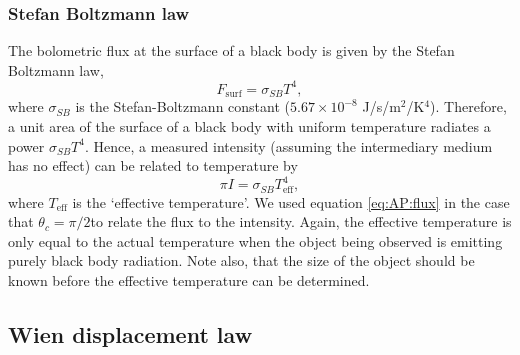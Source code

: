 \subsubsection{Stefan Boltzmann law}
The bolometric flux at the surface of a black body is given by the Stefan Boltzmann law,
%
\begin{equation}
	F_\text{surf} = \sigma_{SB} T^4,
	\label{eq:AP:stefan_boltzmann_law}
\end{equation}
%
where \(\sigma_{SB}\) is the Stefan-Boltzmann constant (\(5.67 \times 10^{-8}\) J/s/m\(^2\)/K\(^4\)).
 Therefore, a unit area of the surface of a black body with uniform temperature radiates a power \(\sigma_{SB} T^4\).
 Hence, a measured intensity (assuming the intermediary medium has no effect) can be related to temperature by
%
\begin{equation}
	\pi I = \sigma_{SB} T^4_{\text{eff}},
	\label{eq:AP:effective_temperature}
\end{equation}
%
where \(T_{\text{eff}}\) is the `effective temperature'. We used equation \ref{eq:AP:flux} in the case that \(\theta_c = \pi / 2 \)to relate the flux to the intensity.
 Again, the effective temperature is only equal to the actual temperature when the object being observed is emitting purely black body radiation.
 Note also, that the size of the object should be known before the effective temperature can be determined.
%
%
\subsection{Wien displacement law}































